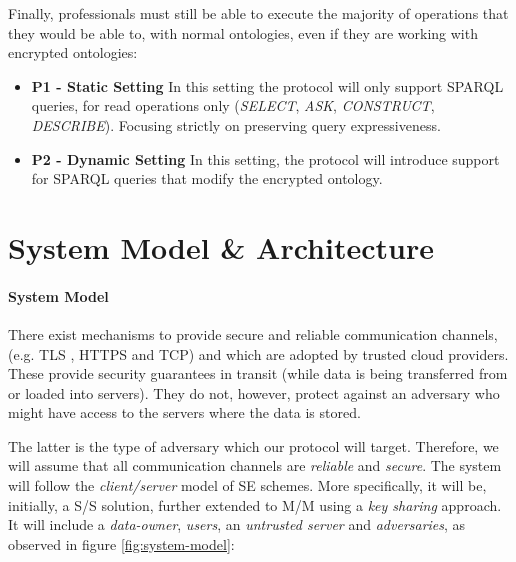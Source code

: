 Finally, professionals must still be able to execute the majority of operations that they would be able to, with normal ontologies, even if they are working with encrypted ontologies:

\begin{itemize}
    \item \textbf{P1 - Static Setting} In this setting the protocol will only support \gls{SPARQL} queries, for read operations only (\emph{SELECT}, \emph{ASK}, \emph{CONSTRUCT}, \emph{DESCRIBE}). Focusing strictly on preserving query expressiveness.
    \item \textbf{P2 - Dynamic Setting} In this setting, the protocol will introduce support for \gls{SPARQL} queries that modify the encrypted ontology.
\end{itemize}

\section{System Model \& Architecture}
\label{ch3:sec:architecture-and-system-model}

\paragraph{System Model} There exist mechanisms to provide secure and reliable communication channels, (e.g. \gls{TLS} \autocite{noauthor_undated-kt}, \gls{HTTPS} \autocite{noauthor_undated-yf} and \gls{TCP}) and which are adopted by trusted cloud providers. These provide security guarantees in transit (while data is being transferred from or loaded into servers). They do not, however, protect against an adversary who might have access to the servers where the data is stored. 

The latter is the type of adversary which our protocol will target. Therefore, we will assume that all communication channels are \emph{reliable} and \emph{secure}. The system will follow the \emph{client/server} model of \gls{SE} schemes. More specifically, it will be, initially, a \gls{S/S} solution, further extended to \gls{M/M} using a \emph{key sharing} approach. It will include a \emph{data-owner}, \emph{users}, an \emph{untrusted server} and \emph{adversaries}, as observed in figure \ref{fig:system-model}:

